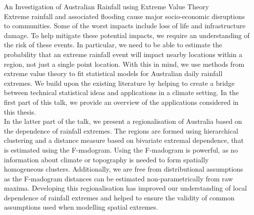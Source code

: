 \documentclass[a4paper,11pt,showtrims]{memoir}
\begin{document}
An Investigation of Australian Rainfall using Extreme Value Theory\\

Extreme rainfall and associated flooding cause major socio-economic disruptions to communities. Some of the worst impacts include loss of life and infrastructure damage. To help mitigate these potential impacts, we require an understanding of the risk of these events. In particular, we need to be able to estimate the probability that an extreme rainfall event will impact nearby locations within a region, not just a single point location. With this in mind, we use methods from extreme value theory to fit statistical models for Australian daily rainfall extremes. We build upon the existing literature by helping to create a bridge between technical statistical ideas and applications in a climate setting. In the first part of this talk, we provide an overview of the applications considered in this thesis. \\


In the latter part of the talk, we present a regionalisation of Australia based on the dependence of rainfall extremes. The regions are formed using hierarchical clustering and a distance measure based on bivariate extremal dependence, that is estimated using the F-madogram. Using the F-madogram is powerful, as no information about climate or topography is needed to form spatially homogeneous clusters. Additionally, we are free from distributional assumptions as the F-madogram distances can be estimated non-parametrically from raw maxima. Developing this regionalisation has improved our understanding of local dependence of rainfall extremes and helped to ensure the validity of common assumptions used when modelling spatial extremes.\\






\end{document}
